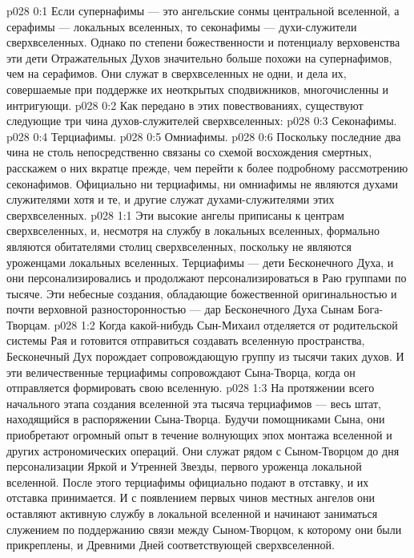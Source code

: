 \author{Могучий Вестник}
\vs p028 0:1 Если супернафимы --- это ангельские сонмы центральной вселенной, а серафимы --- локальных вселенных, то секонафимы --- духи\hyp{}служители сверхвселенных. Однако по степени божественности и потенциалу верховенства эти дети Отражательных Духов значительно больше похожи на супернафимов, чем на серафимов. Они служат в сверхвселенных не одни, и дела их, совершаемые при поддержке их неоткрытых сподвижников, многочисленны и интригующи.
\vs p028 0:2 \pc Как передано в этих повествованиях, существуют следующие три чина духов\hyp{}служителей сверхвселенных:
\vs p028 0:3 \bibnobreakspace Секонафимы.
\vs p028 0:4 \bibnobreakspace Терциафимы.
\vs p028 0:5 \bibnobreakspace Омниафимы.
\vs p028 0:6 \pc Поскольку последние два чина не столь непосредственно связаны со схемой восхождения смертных, расскажем о них вкратце прежде, чем перейти к более подробному рассмотрению секонафимов. Официально ни терциафимы, ни омниафимы не являются духами служителями  хотя и те, и другие служат духами\hyp{}служителями  этих сверхвселенных.
\vs p028 1:1 Эти высокие ангелы приписаны к центрам сверхвселенных, и, несмотря на службу в локальных вселенных, формально являются обитателями столиц сверхвселенных, поскольку не являются уроженцами локальных вселенных. Терциафимы --- дети Бесконечного Духа, и они персонализировались и продолжают персонализироваться в Раю группами по тысяче. Эти небесные создания, обладающие божественной оригинальностью и почти верховной разносторонностью --- дар Бесконечного Духа Сынам Бога\hyp{}Творцам.
\vs p028 1:2 Когда какой\hyp{}нибудь Сын\hyp{}Михаил отделяется от родительской системы Рая и готовится отправиться создавать вселенную пространства, Бесконечный Дух порождает сопровождающую группу из тысячи таких духов. И эти величественные терциафимы сопровождают Сына\hyp{}Творца, когда он отправляется формировать свою вселенную.
\vs p028 1:3 На протяжении всего начального этапа создания вселенной эта тысяча терциафимов --- весь штат, находящийся в распоряжении Сына\hyp{}Творца. Будучи помощниками Сына, они приобретают огромный опыт в течение волнующих эпох монтажа вселенной и других астрономических операций. Они служат рядом с Сыном\hyp{}Творцом до дня персонализации Яркой и Утренней Звезды, первого уроженца локальной вселенной. После этого терциафимы официально подают в отставку, и их отставка принимается. И с появлением первых чинов местных ангелов они оставляют активную службу в локальной вселенной и начинают заниматься служением по поддержанию связи между Сыном\hyp{}Творцом, к которому они были прикреплены, и Древними Дней соответствующей сверхвселенной.
